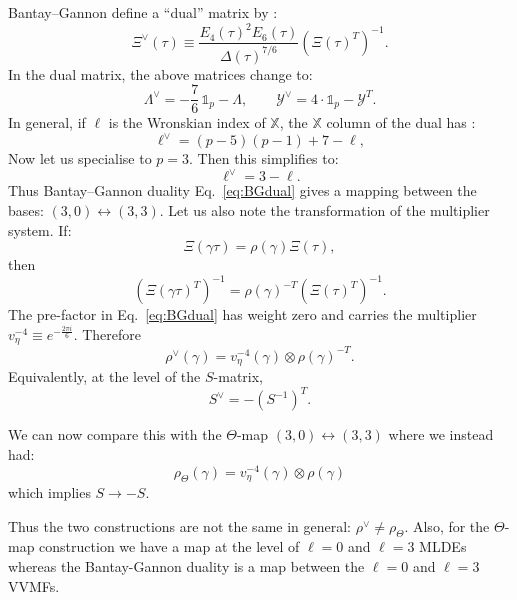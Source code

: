 \documentclass[11pt]{article}
\newcommand\be{\begin{equation}}
\newcommand\ee{\end{equation}}
\begin{document}
Bantay--Gannon define a ``dual'' matrix by \cite{Govindarajan:2025jlq, Bantay:2007zz}:
\begin{equation}
\Xi^\vee(\tau)
\equiv
\frac{E_4(\tau)^2E_6(\tau)}{\Delta(\tau)^{7/6}}
\left(\Xi(\tau)^T\right)^{-1}.
\label{eq:BGdual}
\end{equation}
In the dual matrix, the above matrices change to:
\begin{equation}
\Lambda^\vee=-\frac76\,{\mathds 1}_p-\Lambda,
\qquad
\mathcal{Y}^\vee=4\cdot{\mathds 1}_p-\mathcal{Y}^T .
\label{eq:BGdata}
\end{equation}
In general, if \(\ell\) is the Wronskian index of $\mathbb{X}$, the $\mathbb{X}$ column of the dual has \cite{Govindarajan:2025jlq}:
\begin{equation}
\ell^\vee=(p-5)(p-1)+7-\ell ,
\label{eq:BGellgeneral}
\end{equation}
Now let us specialise to \(p=3\). Then this simplifies to:
\begin{equation}
\ell^\vee=3-\ell .
\label{eq:BGell3}
\end{equation}
Thus Bantay--Gannon duality Eq.~\eqref{eq:BGdual} gives a mapping between the bases: $(3,0) \leftrightarrow (3,3)$. Let us also note the transformation of the multiplier system. If:
\be
\Xi(\gamma\tau)=\rho(\gamma)\Xi(\tau),
\ee
then
\be
\left(\Xi(\gamma\tau)^T\right)^{-1}
=
\rho(\gamma)^{-T}\left(\Xi(\tau)^T\right)^{-1}.
\ee
The pre-factor in Eq.~\eqref{eq:BGdual} has weight zero and carries the multiplier \(v_\eta^{-4}\equiv e^{-\frac{2\pi i}{6}}\). Therefore
\begin{equation}
\rho^\vee(\gamma)=v_\eta^{-4}(\gamma)\otimes \rho(\gamma)^{-T}.
\label{eq:BGmult}
\end{equation}
Equivalently, at the level of the \(S\)-matrix,
\be
S^\vee=-(S^{-1})^T .
\ee

We can now compare this with the $\Theta$-map $(3,0)\leftrightarrow (3,3)$ where we instead had:
\be
\rho_\Theta(\gamma) = v_\eta^{-4}(\gamma)\otimes \rho(\gamma)
\ee
which implies $S\to -S$.

Thus the two constructions are not the same in general: $\rho^\vee\neq\rho_\Theta$. Also, for the $\Theta$-map construction we have a map at the level of $\ell=0$ and $\ell=3$ MLDEs whereas the Bantay-Gannon duality is a map between the $\ell=0$ and $\ell=3$ VVMFs.
\end{document}
